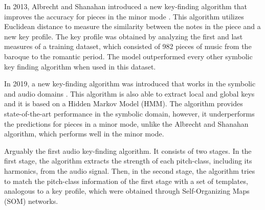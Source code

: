 In 2013, Albrecht and Shanahan introduced a new key-finding
algorithm that improves the accuracy for pieces in the minor
mode \parencite{albrecht2013use}. This algorithm utilizes
Euclidean distance to measure the similarity between the
notes in the piece and a new key profile. The key profile
was obtained by analyzing the first and last measures of a
training dataset, which consisted of 982 pieces of music
from the baroque to the romantic period. The model
outperformed every other symbolic key finding algorithm when
used in this dataset.




In 2019, a new key-finding algorithm was introduced that
works in the symbolic and audio domains
\parencite{napoleslopez2019keyfinding}. This algorithm is
also able to extract local and global keys and it is based
on a Hidden Markov Model (HMM). The algorithm provides
state-of-the-art performance in the symbolic domain,
however, it underperforms the predictions for pieces in a
minor mode, unlike the Albrecht and Shanahan algorithm,
which performs well in the minor mode.




Arguably the first audio key-finding algorithm. It consists
of two stages. In the first stage, the algorithm extracts
the strength of each pitch-class, including its harmonics,
from the audio signal. Then, in the second stage, the
algorithm tries to match the pitch-class information of the
first stage with a set of templates, analogous to a key
profile, which were obtained through Self-Organizing Maps
(SOM) networks.

